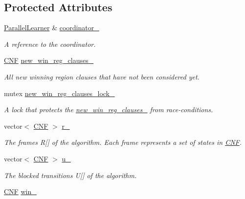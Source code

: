 \subsection*{Protected Attributes}
\begin{DoxyCompactItemize}
\item 
\hyperlink{classParallelLearner}{Parallel\-Learner} \& \hyperlink{classIFM13Explorer_aff7fd95615eb7508a22b6b4992061678}{coordinator\-\_\-}
\begin{DoxyCompactList}\small\item\em A reference to the coordinator. \end{DoxyCompactList}\item 
\hyperlink{classCNF}{C\-N\-F} \hyperlink{classIFM13Explorer_a712b3dc6c099b1e3697e7b8877e0cd90}{new\-\_\-win\-\_\-reg\-\_\-clauses\-\_\-}
\begin{DoxyCompactList}\small\item\em All new winning region clauses that have not been considered yet. \end{DoxyCompactList}\item 
mutex \hyperlink{classIFM13Explorer_a2e2722cb76399e087f62445b959ff5ed}{new\-\_\-win\-\_\-reg\-\_\-clauses\-\_\-lock\-\_\-}
\begin{DoxyCompactList}\small\item\em A lock that protects the \hyperlink{classIFM13Explorer_a712b3dc6c099b1e3697e7b8877e0cd90}{new\-\_\-win\-\_\-reg\-\_\-clauses\-\_\-} from race-\/conditions. \end{DoxyCompactList}\item 
vector$<$ \hyperlink{classCNF}{C\-N\-F} $>$ \hyperlink{classIFM13Explorer_a559dde7f5e4e528ea495c1f4a4d1d072}{r\-\_\-}
\begin{DoxyCompactList}\small\item\em The frames R\mbox{[}\mbox{]} of the algorithm. Each frame represents a set of states in \hyperlink{classCNF}{C\-N\-F}. \end{DoxyCompactList}\item 
vector$<$ \hyperlink{classCNF}{C\-N\-F} $>$ \hyperlink{classIFM13Explorer_a1f8ea34a97c568894a23a7361339f9ec}{u\-\_\-}
\begin{DoxyCompactList}\small\item\em The blocked transitions U\mbox{[}\mbox{]} of the algorithm. \end{DoxyCompactList}\item 
\hyperlink{classCNF}{C\-N\-F} \hyperlink{classIFM13Explorer_ac18c17a8e34556f0ad500c471a74f6ce}{win\-\_\-}

\end{DoxyCompactItemize}
